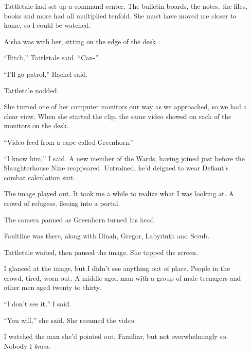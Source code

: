 Tattletale had set up a command center.  The bulletin boards, the notes, the files, books and more had all multiplied tenfold.  She must have moved me closer to home, so I could be watched.



Aisha was with her, sitting on the edge of the desk.



``Bitch,'' Tattletale said.  ``Can-''



``I'll go patrol,'' Rachel said.



Tattletale nodded.



She turned one of her computer monitors our way as we approached, so we had a clear view.  When she started the clip, the same video showed on each of the monitors on the desk.



``Video feed from a cape called Greenhorn.''



``I know him,'' I said.  A new member of the Wards, having joined just before the Slaughterhouse Nine reappeared.  Untrained, he'd deigned to wear Defiant's combat calculation suit.



The image played out.  It took me a while to realize what I was looking at.  A crowd of refugees, fleeing into a portal.



The camera panned as Greenhorn turned his head.



Faultline was there, along with Dinah, Gregor, Labyrinth and Scrub.



Tattletale waited, then paused the image.  She tapped the screen.



I glanced at the image, but I didn't see anything out of place.  People in the crowd, tired, worn out.  A middle-aged man with a group of male teenagers and other men aged twenty to thirty.



``I don't see it,'' I said.



``You will,'' she said.  She resumed the video.



I watched the man she'd pointed out.  Familiar, but not overwhelmingly so.  Nobody I \emph{knew}.



